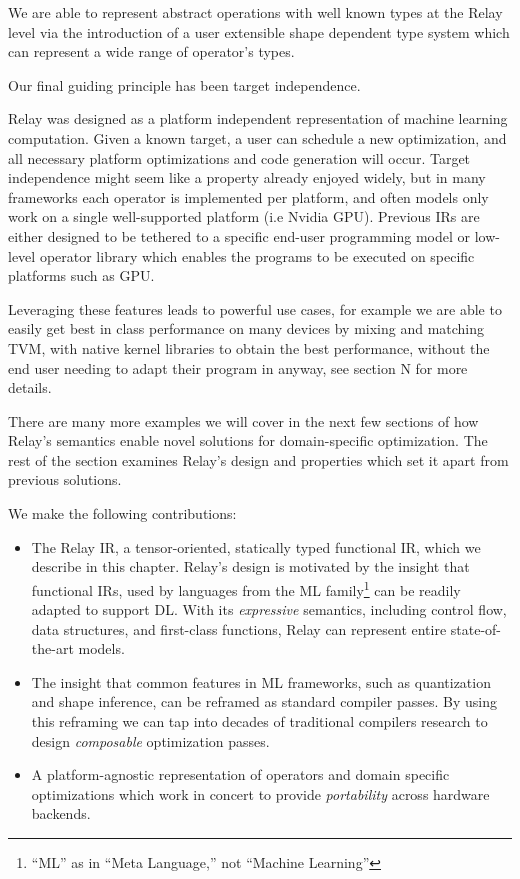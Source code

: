 We are able to represent abstract operations with well known types at the Relay level via the introduction of a user extensible shape dependent
  type system which can represent a wide range of operator’s types.

Our final guiding principle has been target independence.

Relay was designed as a platform independent representation of machine learning computation.
Given a known target, a user can schedule a new optimization,
  and all necessary platform optimizations and code generation will occur.
Target independence might seem like a property already enjoyed widely,
  but in many frameworks each operator is implemented per platform,
  and often models only work on a single well-supported platform (i.e Nvidia GPU).
Previous IRs are either designed to be tethered to a specific end-user programming model
    or low-level operator library which enables the programs to be executed on specific platforms such as GPU.

Leveraging these features leads to powerful use cases, for example we are able to easily get best in class performance on many devices
by mixing and matching TVM, with native kernel libraries to obtain the best performance, without the end user needing to adapt their program
in anyway, see section N for more details.

There are many more examples we will cover in the next few sections of how Relay’s semantics enable novel solutions for domain-specific optimization.
The rest of the section examines Relay’s design and properties which set it apart from previous solutions.

We make the following contributions:
\begin{itemize}
  \item The Relay IR, a tensor-oriented, statically typed
    functional IR,
    which we describe in this chapter.
  Relay's design is motivated by the insight that functional IRs, used by
  languages from the ML family\footnote{``ML'' as in ``Meta Language,'' not
  ``Machine Learning''} can be readily adapted to support DL.
  With its \textit{expressive} semantics,
    including control flow, data structures, and first-class functions,
    Relay can represent entire state-of-the-art models.
  \item The insight that common features in ML frameworks,
    such as quantization and shape inference,
    can be reframed as standard compiler passes.
  By using this reframing we can tap into
    decades of traditional compilers research to design
    \textit{composable} optimization passes.
  \item
    A platform-agnostic representation of operators and domain specific
      optimizations which work in concert to provide \textit{portability}
      across hardware backends.
\end{itemize}

